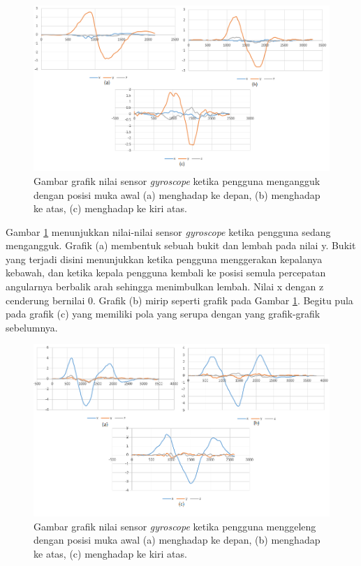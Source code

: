 \documentclass[a4paper,twoside]{article}
\begin{document}
\begin{enumerate}
\begin{figure}[htbp]
\centering
\includegraphics[scale=0.6]{Gambar/grafik-sensor-gyroscope-mengangguk.png}
\caption{Gambar grafik nilai sensor \textit{gyroscope} ketika pengguna mengangguk dengan posisi muka awal (a) menghadap ke depan, (b) menghadap ke atas, (c) menghadap ke kiri atas.}
\label{fig:grafik-sensor-gyroscope-mengangguk}
\end{figure}
Gambar \ref{fig:grafik-sensor-gyroscope-mengangguk} menunjukkan nilai-nilai sensor \textit{gyroscope} ketika pengguna sedang mengangguk. Grafik (a) membentuk sebuah bukit dan lembah pada nilai y. Bukit yang terjadi disini menunjukkan ketika pengguna menggerakan kepalanya kebawah, dan ketika kepala pengguna kembali ke posisi semula percepatan angularnya berbalik arah sehingga menimbulkan lembah. Nilai x dengan z cenderung bernilai 0. Grafik (b) mirip seperti grafik pada Gambar \ref{fig:grafik-sensor-gyroscope-mengangguk}. Begitu pula pada grafik (c) yang memiliki pola yang serupa dengan yang grafik-grafik sebelumnya.

\begin{figure}[htbp]
\centering
\includegraphics[scale=0.6]{Gambar/grafik-sensor-gyroscope-menggeleng.png}
\caption{Gambar grafik nilai sensor \textit{gyroscope} ketika pengguna menggeleng dengan posisi muka awal (a) menghadap ke depan, (b) menghadap ke atas, (c) menghadap ke kiri atas.} 
\label{fig:grafik-sensor-gyroscope-menggeleng}
\end{figure}


\end{enumerate}
\end{document}
